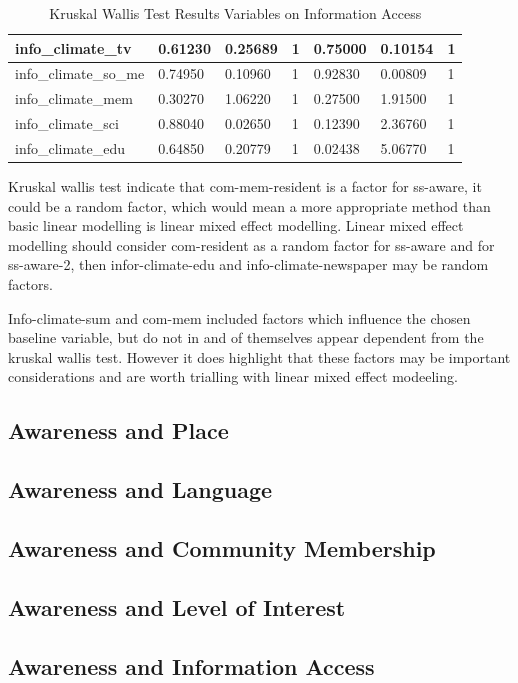 \begin{table}[h]
\begin{tabular}{|l|l|l|l|l|l|l|}
        info\_climate\_tv & 0.61230 & 0.25689 & 1 & 0.75000 & 0.10154 & 1 \\ \hline
        info\_climate\_so\_me & 0.74950 & 0.10960 & 1 & 0.92830 & 0.00809 & 1 \\ \hline
        info\_climate\_mem & 0.30270 & 1.06220 & 1 & 0.27500 & 1.91500 & 1 \\ \hline
        info\_climate\_sci & 0.88040 & 0.02650 & 1 & 0.12390 & 2.36760 & 1 \\ \hline
        info\_climate\_edu & 0.64850 & 0.20779 & 1 & \cellcolor[HTML]{7df9ff} 0.02438 & 5.06770 & 1 \\ \hline
    \end{tabular}
    \caption{Kruskal Wallis Test Results Variables on Information Access}
    \label{Kruskal_wallis_test_information}
\end{table}

Kruskal wallis test indicate that com-mem-resident is a factor for ss-aware, it could be a random factor, which would mean a more appropriate method than basic linear modelling is linear mixed effect modelling. Linear mixed effect modelling should consider com-resident as a random factor for ss-aware and for ss-aware-2, then infor-climate-edu and info-climate-newspaper may be random factors.

Info-climate-sum and com-mem included factors which influence the chosen baseline variable, but do not in and of themselves appear dependent from the kruskal wallis test. However it does highlight that these factors may be important considerations and are worth trialling with linear mixed effect modeeling.

\subsection{ Awareness and Place}

\subsection{Awareness and Language}

\subsection{Awareness and Community Membership}

\subsection{Awareness and Level of Interest}

\subsection{Awareness and Information Access}